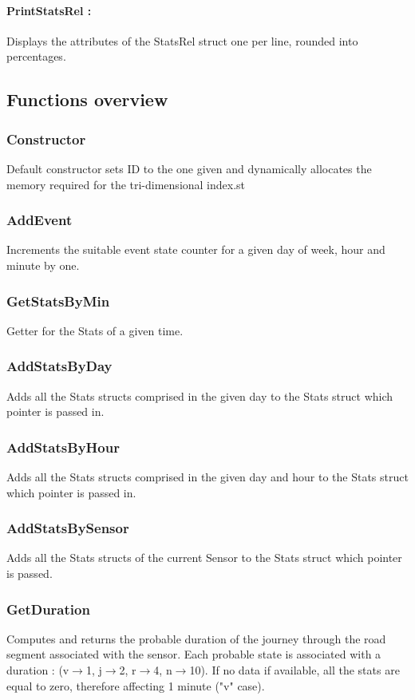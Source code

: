 \documentclass[10pt]{article}
\begin{document}
\paragraph{PrintStatsRel :}
Displays the attributes of the StatsRel struct one per line, rounded into percentages.

\subsection{Functions overview}

\subsubsection*{Constructor}
Default constructor sets ID to the one given and dynamically allocates the memory required for the tri-dimensional index.st

\subsubsection*{AddEvent}
Increments the suitable event state counter for a given day of week, hour and minute by one.

\subsubsection*{GetStatsByMin}
Getter for the Stats of a given time.

\subsubsection*{AddStatsByDay}
Adds all the Stats structs comprised in the given day to the Stats struct which pointer is passed in.

\subsubsection*{AddStatsByHour}
Adds all the Stats structs comprised in the given day and hour to the Stats struct which pointer is passed in.

\subsubsection*{AddStatsBySensor}
Adds all the Stats structs of the current Sensor to the Stats struct which pointer is passed.

\subsubsection*{GetDuration}
Computes and returns the probable duration of the journey through the road segment associated with the sensor. Each probable state is associated with a duration : (v$\to$1, j$\to$2, r$\to$4, n$\to$10). If no data if available, all the stats are equal to zero, therefore affecting 1 minute ("v" case).
\end{document}
